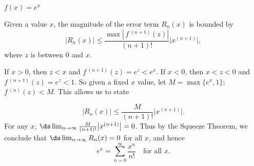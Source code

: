 {$f(x) = e^x$
}
{Given a value $x$, the magnitude of the error term $R_n(x)$ is bounded by
$$ \big|R_n(x)\big| \leq \frac{\max\left|\,f\,^{(n+1)}(z)\right|}{(n+1)!}\big|x^{(n+1)}\big|,$$
where $z$ is between $0$ and $x$. 

If $x>0$, then $z<x$ and $f\,^{(n+1)}(z) =e^z<e^x$. If $x<0$, then $x<z<0$ and $f\,^{(n+1)}(z) =e^z<1$. So given a fixed $x$ value, let $M = \max\{e^x,1\}$; $f\,^{(n)}(z)<M.$ This allows us to state

$$ \big|R_n(x)\big| \leq \frac{M}{(n+1)!}\big|x^{(n+1)}\big|.$$
For any $x$, $\ds\lim_{n\to\infty} \frac{M}{(n+1)!}\big|x^{(n+1)}\big|= 0$. Thus by the Squeeze Theorem, we conclude that $\ds \lim_{n\to\infty} R_n(x) = 0$ for all $x$, and hence
$$e^x = \sum_{n=0}^\infty \frac{x^{n}}{n!}\quad \text{for all $x$}.$$
}